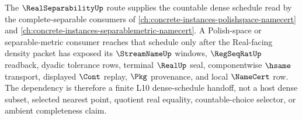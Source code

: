 The $\RealSeparabilityUp$ route supplies the countable dense schedule read by
the complete-separable consumers of
\autoref{ch:concrete-instances-polishspace-namecert} and
\autoref{ch:concrete-instances-separablemetric-namecert}. A Polish-space or
separable-metric consumer reaches that schedule only after the Real-facing
density packet has exposed its $\StreamNameUp$ windows, $\RegSeqRatUp$
readback, dyadic tolerance rows, terminal $\RealUp$ seal, componentwise
$\hsame$ transport, displayed $\Cont$ replay, $\Pkg$ provenance, and local
$\NameCert$ row. The dependency is therefore a finite L10 dense-schedule
handoff, not a host dense subset, selected nearest point, quotient real
equality, countable-choice selector, or ambient completeness claim.
